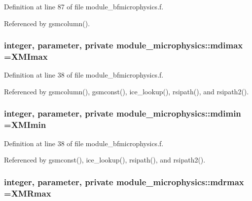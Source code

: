 Definition at line 87 of file module\+\_\+bfmicrophysics.\+f.



Referenced by gsmcolumn().

\subsubsection[{\texorpdfstring{mdimax}{mdimax}}]{\setlength{\rightskip}{0pt plus 5cm}integer, parameter, private module\+\_\+microphysics\+::mdimax =X\+M\+Imax\hspace{0.3cm}{\ttfamily [private]}}\hypertarget{namespacemodule__microphysics_a28b728213c1425c1bd5c05c9a469b92a}{}\label{namespacemodule__microphysics_a28b728213c1425c1bd5c05c9a469b92a}


Definition at line 38 of file module\+\_\+bfmicrophysics.\+f.



Referenced by gsmcolumn(), gsmconst(), ice\+\_\+lookup(), rsipath(), and rsipath2().

\subsubsection[{\texorpdfstring{mdimin}{mdimin}}]{\setlength{\rightskip}{0pt plus 5cm}integer, parameter, private module\+\_\+microphysics\+::mdimin =X\+M\+Imin\hspace{0.3cm}{\ttfamily [private]}}\hypertarget{namespacemodule__microphysics_a81bcf203ed1a75b10ea2c7f97ac56a21}{}\label{namespacemodule__microphysics_a81bcf203ed1a75b10ea2c7f97ac56a21}


Definition at line 38 of file module\+\_\+bfmicrophysics.\+f.



Referenced by gsmconst(), ice\+\_\+lookup(), rsipath(), and rsipath2().

\subsubsection[{\texorpdfstring{mdrmax}{mdrmax}}]{\setlength{\rightskip}{0pt plus 5cm}integer, parameter, private module\+\_\+microphysics\+::mdrmax =X\+M\+Rmax\hspace{0.3cm}{\ttfamily [private]}}\hypertarget{namespacemodule__microphysics_aa21f2a4aa4dc086cbe80493ae7da6b8b}{}\label{namespacemodule__microphysics_aa21f2a4aa4dc086cbe80493ae7da6b8b}


